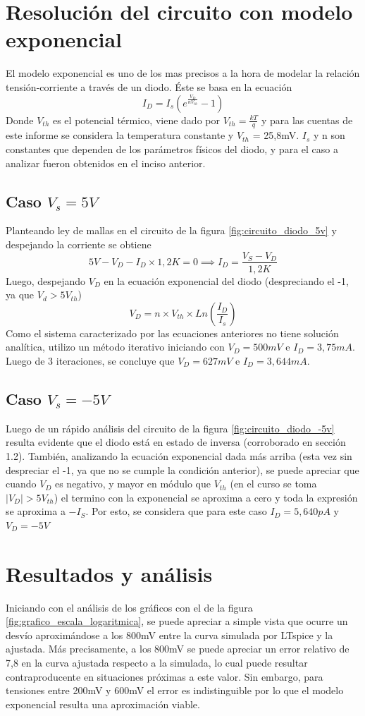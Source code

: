 \documentclass[10pt]{article}
\begin{document}
\section{Resolución del circuito con modelo exponencial}
\quad El modelo exponencial es uno de los mas precisos a la hora de modelar la relación tensión-corriente a través de un diodo. Éste se basa en la ecuación $$I_D = I_s(e^{\frac{V_D}{nV_{th}}}-1)$$ Donde $V_{th}$ es el potencial térmico, viene dado por $V_{th} = \frac{kT}{q}$ y para las cuentas de este informe se considera la temperatura constante y $V_{th}$ = 25,8mV. $I_s$ y n son constantes que dependen de los parámetros físicos del diodo, y para el caso a analizar fueron obtenidos en el inciso anterior.
\subsection{Caso $V_s = 5V$}
Planteando ley de mallas en el circuito de la figura \ref{fig:circuito_diodo_5v} y despejando la corriente se obtiene $$5V - V_D -I_D\times1,2K = 0 \implies I_D = \frac{V_S-V_D}{1,2K}$$
Luego, despejando $V_D$ en la ecuación exponencial del diodo (despreciando el -1, ya que $V_d > 5V_{th}$) $$V_D = n\times V_{th}\times Ln(\frac{I_D}{I_s})$$
Como el sistema caracterizado por las ecuaciones anteriores no tiene solución analítica, utilizo un método iterativo iniciando con $V_D = 500mV$ e $I_D = 3,75mA$. Luego de 3 iteraciones, se concluye que $V_D = 627mV$ e $I_D = 3,644mA$.
\subsection{Caso $V_s = -5V$}
\quad Luego de un rápido análisis del circuito de la figura \ref{fig:circuito_diodo_-5v} resulta evidente que el diodo está en estado de inversa (corroborado en sección 1.2). También, analizando la ecuación exponencial dada más arriba (esta vez sin despreciar el -1, ya que no se cumple la condición anterior), se puede apreciar que cuando $V_D$ es negativo, y mayor en módulo que $V_{th}$ (en el curso se toma $|V_D|>5V_{th}$) el termino con la exponencial se aproxima a cero y toda la expresión se aproxima a $-I_S$. Por esto, se considera que para este caso $I_D = 5,640pA$ y $V_D = -5V$

\section{Resultados y análisis}
\quad Iniciando con el análisis de los gráficos con el de la figura \ref{fig:grafico_escala_logaritmica}, se puede apreciar a simple vista que ocurre un desvío aproximándose a los 800mV entre la curva simulada por LTspice y la ajustada. Más precisamente, a los 800mV se puede apreciar un error relativo de 7,8 en la curva ajustada respecto a la simulada, lo cual puede resultar contraproducente en situaciones próximas a este valor. Sin embargo, para tensiones entre 200mV y 600mV el error es indistinguible por lo que el modelo exponencial resulta una aproximación viable.
\end{document}
